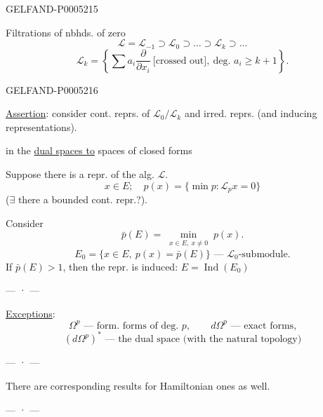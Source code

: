 \begin{GelfandAdjacentEvidence}{GELFAND-P000521}{5}


Filtrations of nbhds. of zero
\[
\mathcal L=\mathcal L_{-1}\supset\mathcal L_0\supset\ldots
\supset\mathcal L_k\supset\ldots
\]
\[
\mathcal L_k=\left\{\sum a_i\frac{\partial}{\partial x_i}\
\text{[crossed out]},\ \text{deg. }a_i\geqslant k+1\right\}.
\]
\end{GelfandAdjacentEvidence}
\begin{GelfandAdjacentEvidence}{GELFAND-P000521}{6}


\uline{Assertion}: consider cont. reprs. of $\mathcal L_0/\mathcal L_k$
and irred. reprs. (and inducing representations).

 in the \uline{dual spaces to} spaces of closed forms

Suppose there is a repr. of the alg. $\mathcal L$.
\[
x\in E;\quad p(x)=\{\min p:\mathcal L_p x=0\}
\]
($\exists$ there a bounded cont. repr.?).

Consider
\[
\bar p(E)=\min_{\substack{x\in E,\ x\ne0}}p(x).
\]
\[
E_0=\{x\in E,\ p(x)=\bar p(E)\}\text{ — }\mathcal L_0\text{-submodule}.
\]
If $\bar p(E)>1$, then the repr. is induced: $E=\operatorname{Ind}(E_0)$
\end{GelfandAdjacentEvidence}


\begin{center}— · —\end{center}
\uline{Exceptions}:
\[
\Omega^p\text{ — form. forms of deg. }p,\qquad
d\Omega^p\text{ — exact forms,}
\]
\[
(d\Omega^p)^*\text{ — the dual space (with the natural topology)}
\]
\begin{center}— · —\end{center}
There are corresponding results for Hamiltonian ones as well.
\begin{center}— · —\end{center}


